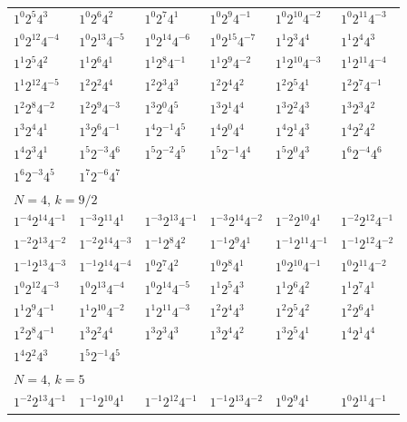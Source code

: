 \documentclass[12pt]{amsart}
\numberwithin{equation}{section}
\theoremstyle{plain}
\theoremstyle{definition}
\theoremstyle{remark}
\begin{document}
\begin{longtable}{llllll}
$1^{0}2^{5}4^{3}$ & $1^{0}2^{6}4^{2}$ & $1^{0}2^{7}4^{1}$ & $1^{0}2^{9}4^{-1}$ & $1^{0}2^{10}4^{-2}$ & $1^{0}2^{11}4^{-3}$\\
$1^{0}2^{12}4^{-4}$ & $1^{0}2^{13}4^{-5}$ & $1^{0}2^{14}4^{-6}$ & $1^{0}2^{15}4^{-7}$ & $1^{1}2^{3}4^{4}$ & $1^{1}2^{4}4^{3}$\\
$1^{1}2^{5}4^{2}$ & $1^{1}2^{6}4^{1}$ & $1^{1}2^{8}4^{-1}$ & $1^{1}2^{9}4^{-2}$ & $1^{1}2^{10}4^{-3}$ & $1^{1}2^{11}4^{-4}$\\
$1^{1}2^{12}4^{-5}$ & $1^{2}2^{2}4^{4}$ & $1^{2}2^{3}4^{3}$ & $1^{2}2^{4}4^{2}$ & $1^{2}2^{5}4^{1}$ & $1^{2}2^{7}4^{-1}$\\
$1^{2}2^{8}4^{-2}$ & $1^{2}2^{9}4^{-3}$ & $1^{3}2^{0}4^{5}$ & $1^{3}2^{1}4^{4}$ & $1^{3}2^{2}4^{3}$ & $1^{3}2^{3}4^{2}$\\
$1^{3}2^{4}4^{1}$ & $1^{3}2^{6}4^{-1}$ & $1^{4}2^{-1}4^{5}$ & $1^{4}2^{0}4^{4}$ & $1^{4}2^{1}4^{3}$ & $1^{4}2^{2}4^{2}$\\
$1^{4}2^{3}4^{1}$ & $1^{5}2^{-3}4^{6}$ & $1^{5}2^{-2}4^{5}$ & $1^{5}2^{-1}4^{4}$ & $1^{5}2^{0}4^{3}$ & $1^{6}2^{-4}4^{6}$\\
$1^{6}2^{-3}4^{5}$ & $1^{7}2^{-6}4^{7}$ & &&&\\
\midrule
\multicolumn{6}{l}{$N=4$, $k=9/2$}\\
$1^{-4}2^{14}4^{-1}$ & $1^{-3}2^{11}4^{1}$ & $1^{-3}2^{13}4^{-1}$ & $1^{-3}2^{14}4^{-2}$ & $1^{-2}2^{10}4^{1}$ & $1^{-2}2^{12}4^{-1}$\\
$1^{-2}2^{13}4^{-2}$ & $1^{-2}2^{14}4^{-3}$ & $1^{-1}2^{8}4^{2}$ & $1^{-1}2^{9}4^{1}$ & $1^{-1}2^{11}4^{-1}$ & $1^{-1}2^{12}4^{-2}$\\
$1^{-1}2^{13}4^{-3}$ & $1^{-1}2^{14}4^{-4}$ & $1^{0}2^{7}4^{2}$ & $1^{0}2^{8}4^{1}$ & $1^{0}2^{10}4^{-1}$ & $1^{0}2^{11}4^{-2}$\\
$1^{0}2^{12}4^{-3}$ & $1^{0}2^{13}4^{-4}$ & $1^{0}2^{14}4^{-5}$ & $1^{1}2^{5}4^{3}$ & $1^{1}2^{6}4^{2}$ & $1^{1}2^{7}4^{1}$\\
$1^{1}2^{9}4^{-1}$ & $1^{1}2^{10}4^{-2}$ & $1^{1}2^{11}4^{-3}$ & $1^{2}2^{4}4^{3}$ & $1^{2}2^{5}4^{2}$ & $1^{2}2^{6}4^{1}$\\
$1^{2}2^{8}4^{-1}$ & $1^{3}2^{2}4^{4}$ & $1^{3}2^{3}4^{3}$ & $1^{3}2^{4}4^{2}$ & $1^{3}2^{5}4^{1}$ & $1^{4}2^{1}4^{4}$\\
$1^{4}2^{2}4^{3}$ & $1^{5}2^{-1}4^{5}$ & &&&\\
\midrule
\multicolumn{6}{l}{$N=4$, $k=5$}\\
$1^{-2}2^{13}4^{-1}$ & $1^{-1}2^{10}4^{1}$ & $1^{-1}2^{12}4^{-1}$ & $1^{-1}2^{13}4^{-2}$ & $1^{0}2^{9}4^{1}$ & $1^{0}2^{11}4^{-1}$\\

\end{longtable}
\end{document}
